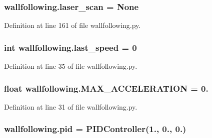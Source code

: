 \subsubsection[{\texorpdfstring{laser\+\_\+scan}{laser_scan}}]{\setlength{\rightskip}{0pt plus 5cm}wallfollowing.\+laser\+\_\+scan = None}\hypertarget{namespacewallfollowing_a35ff373c811db70d98205347a736c606}{}\label{namespacewallfollowing_a35ff373c811db70d98205347a736c606}


Definition at line 161 of file wallfollowing.\+py.

\subsubsection[{\texorpdfstring{last\+\_\+speed}{last_speed}}]{\setlength{\rightskip}{0pt plus 5cm}int wallfollowing.\+last\+\_\+speed = 0}\hypertarget{namespacewallfollowing_a9ee8d77a4629b5d8ecb2899da6e3a7fe}{}\label{namespacewallfollowing_a9ee8d77a4629b5d8ecb2899da6e3a7fe}


Definition at line 35 of file wallfollowing.\+py.

\subsubsection[{\texorpdfstring{M\+A\+X\+\_\+\+A\+C\+C\+E\+L\+E\+R\+A\+T\+I\+ON}{MAX_ACCELERATION}}]{\setlength{\rightskip}{0pt plus 5cm}float wallfollowing.\+M\+A\+X\+\_\+\+A\+C\+C\+E\+L\+E\+R\+A\+T\+I\+ON = 0.}\hypertarget{namespacewallfollowing_acc4e21a1971c33663609d022c899c167}{}\label{namespacewallfollowing_acc4e21a1971c33663609d022c899c167}


Definition at line 31 of file wallfollowing.\+py.

\subsubsection[{\texorpdfstring{pid}{pid}}]{\setlength{\rightskip}{0pt plus 5cm}wallfollowing.\+pid = {\bf P\+I\+D\+Controller}(1., 0., 0.)}\hypertarget{namespacewallfollowing_adc9f95e0b626be8ddae98a596a38e7e8}{}\label{namespacewallfollowing_adc9f95e0b626be8ddae98a596a38e7e8}


